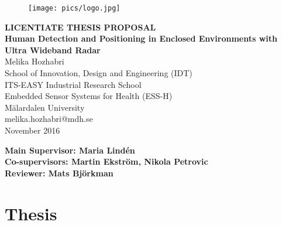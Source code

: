 \documentclass[12pt]{article}
\begin{document}
\begin{center}

\begin{figure}[th]
    \centering
		\texttt{[image: pics/logo.jpg]}
	\label{fig:logo}
\end{figure}

\vspace{4cm}

\LARGE \textbf {LICENTIATE THESIS PROPOSAL} \\[2cm]

\LARGE \textbf {Human Detection and Positioning in Enclosed Environments with Ultra Wideband Radar} \\[2cm]


\normalsize{Melika Hozhabri} \\
School of Innovation, Design and Engineering (IDT) \\
ITS-EASY Industrial Research School\\
Embedded Sensor Systems for Health (ESS-H)\\
M\"{a}lardalen University \\
melika.hozhabri@mdh.se \\
November 2016\\

\vspace{3cm}

\begin{minipage}{1.0\textwidth}
\begin{flushright} \small 
\textbf{Main Supervisor: Maria Lind\'{e}n} \\
\textbf{Co-supervisors: Martin Ekstr\"{o}m, Nikola Petrovic}\\
\textbf{Reviewer: Mats Bj\"{o}rkman}

\end{flushright}
\end{minipage}


\vfill


\end{center}

\newpage
\pagestyle{plain}
\setcounter{page}{1}
\tableofcontents


\newpage


\newpage

\part{Thesis}
\newpage
%
%

%
%

%
%

%
%

%
%

%
%
%
%
%
\end{document}
